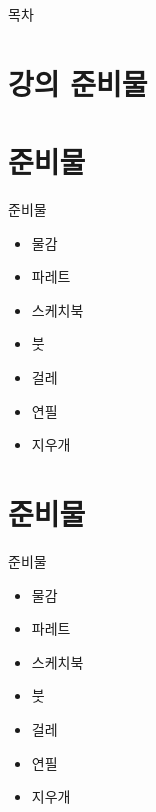 \documentclass[aspectratio=1610,17pt,xcolor=pdftex,dvipsnames,table,handout]{beamer}
\begin{document}
		\begin{frame} [plain]{목차}
		\tableofcontents%
		\end{frame}
		

%
	\section{강의 준비물 }
	\frame [plain] {\sectionpage}


		\section{준비물}

		\begin{frame} [t,plain]
			\begin{block} {준비물}
			\begin{itemize}
				\item 물감
				\item 파레트
				\item 스케치북
				\item 붓
				\item 걸레
				\item 연필
				\item 지우개
			\end{itemize}
			\end{block}
		\end{frame}

		\section{준비물}

		\begin{frame} [t,plain]
			\begin{block} {준비물}
			\begin{itemize}
				\item 물감
				\item 파레트
				\item 스케치북
				\item 붓
				\item 걸레
				\item 연필
				\item 지우개
			\end{itemize}
			\end{block}
		\end{frame}
\end{document}
